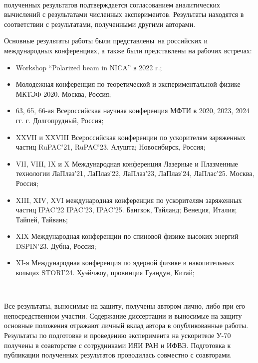 ~\\
\par {\reliability} полученных результатов подтверждается согласованием аналитических вычислений с результатами численных экспериментов. Результаты находятся в соответствии с результатами, полученными другими авторами.
~\\
\par {\probation}
Основные результаты работы были представлены~на российских и международных конференциях, а также были представлены на рабочих встречах: 
\begin{itemize}
\item Workshop “Polarized beam in NICA” в 2022 г.;
\item Молодежная конференция по теоретической и экспериментальной физике МКТЭФ-2020. Москва, Россия;
\item 63, 65, 66-ая Всероссийская научная конференция МФТИ в 2020, 2023, 2024 гг. г. Долгопрудный,
Россия;
\item XXVII и XXVIII Всероссийская конференции по ускорителям заряженных частиц RuPAC'21, RuPAC'23. Алушта; Новосибирск, Россия;
\item VII, VIII, IX и X Международная конференция Лазерные и Плазменные технологии ЛаПлаз'21, ЛаПлаз'22, ЛаПлаз'23, ЛаПлаз'24, ЛаПлас'25. Москва, Россия;
\item XIII, XIV, XVI международная конференция по ускорителям заряженных частиц IPAC'22 IPAC'23, IPAC'25. Бангкок, Тайланд; Венеция, Италия; Тайпей, Тайвань;
\item XIX Международная конференции по спиновой физике высоких энергий DSPIN'23. Дубна, Россия;
\item XI-я Международная конференция по ядерной физике в накопительных кольцах STORI’24. Хуэйчжоу, провинция Гуандун, Китай;
\end{itemize}
~\\
\par {\contribution} Все результаты, выносимые на защиту, получены автором лично, либо при его непосредственном участии. Содержание диссертации и выносимые на защиту основные положения отражают личный вклад автора в опубликованные работы. Результаты по подготовке и проведению эксперимента на ускорителе У-70 получены в соавторстве с сотрудниками ИЯИ РАН и ИФВЭ. Подготовка к публикации полученных результатов проводилась совместно с соавторами.
~\\

